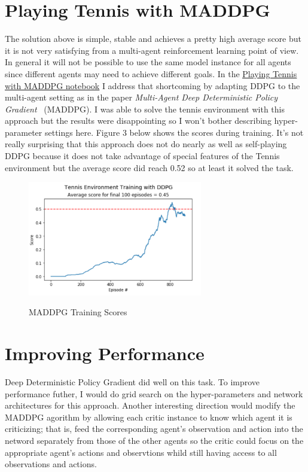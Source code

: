\documentclass[sigchi]{acmart}
\begin{document}
\section{Playing Tennis with MADDPG}
The solution above is simple, stable and achieves a pretty high average score but it is not very satisfying from a multi-agent reinforcement learning point of view.  In general it will not be possible to use the same model instance for all agents since different agents may need to achieve different goals.
In the 
\href{https://nbviewer.jupyter.org/github/bobflagg/Collaboration-and-Competition/blob/master/02-Playing-Tennis-with-MADDPG.ipynb}{\underline{Playing Tennis with MADDPG notebook}}
 I address that shortcoming by adapting DDPG to the multi-agent setting as in the paper {\em Multi-Agent Deep Deterministic Policy Gradient}~\cite{DBLP:journals/corr/LoweWTHAM17} (MADDPG).   I was able to solve the tennis environment with this approach but the results were disappointing so I won't bother describing hyper-parameter settings here.  Figure 3 below shows the scores during training.  It's not really surprising that this approach does not do nearly as well as self-playing DDPG because it does not take advantage of special features of the Tennis environment but the average score did reach 0.52 so at least it solved the task.
\begin{figure}[h]
	\centering
	\includegraphics[width=3.0in]{ma-scores}
	\label{fig:ddpg-scores}
	\caption{MADDPG Training Scores}
\end{figure}

\section{Improving Performance}

Deep Deterministic Policy Gradient did well on this task.  To improve performance futher, I would do grid search on the hyper-parameters and network architectures for this approach.  Another interesting direction would modify the MADDPG agorithm by allowing each critic instance to know which agent it is criticizing; that is, feed the corresponding agent's observation and action into the netword separately from those of the other agents so the critic could focus on the appropriate agent's actions and observtions whild still having access to all observations and actions.



\end{document}
